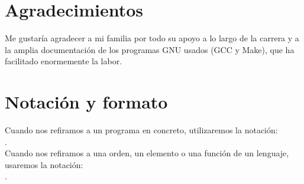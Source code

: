 

\section*{Agradecimientos}

Me gustaría agradecer a mi familia por todo su apoyo a lo largo de la carrera y a la amplia documentación de los programas GNU usados (GCC y Make), que ha facilitado enormemente la labor.

\cleardoublepage


%
%

\cleardoublepage

\section*{Notación y formato}

Cuando nos refiramos a un programa en concreto, utilizaremos la
notación: \\ .\\

Cuando nos refiramos a una orden, un elemento o una función de un lenguaje, usaremos
la notación: \\ .\\
